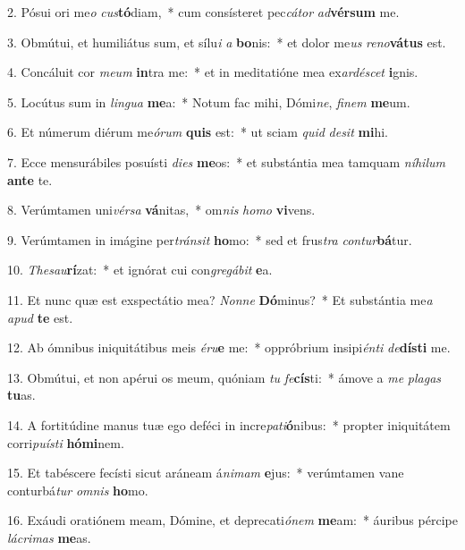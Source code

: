2. Pósui ori me\textit{o} \textit{cus}\textbf{tó}diam,~*  cum consísteret pec\textit{cá}\textit{tor} \textit{ad}\textbf{vér}\textbf{sum} me.\

3. Obmútui, et humiliátus sum, et sílu\textit{i} \textit{a} \textbf{bo}nis:~*  et dolor me\textit{us} \textit{re}\textit{no}\textbf{vá}\textbf{tus} est.\

4. Concáluit cor \textit{me}\textit{um} \textbf{in}tra me:~*  et in meditatióne mea ex\textit{ar}\textit{dé}\textit{scet} \textbf{i}gnis.\

5. Locútus sum in \textit{lin}\textit{gua} \textbf{me}a:~*  Notum fac mihi, Dómi\textit{ne}, \textit{fi}\textit{nem} \textbf{me}um.\

6. Et númerum diérum me\textit{ó}\textit{rum} \textbf{quis} est:~*  ut sciam \textit{quid} \textit{de}\textit{sit} \textbf{mi}hi.\

7. Ecce mensurábiles posuísti \textit{di}\textit{es} \textbf{me}os:~*  et substántia mea tamquam \textit{ní}\textit{hi}\textit{lum} \textbf{an}\textbf{te} te.\

8. Verúmtamen uni\textit{vér}\textit{sa} \textbf{vá}nitas,~*  om\textit{nis} \textit{ho}\textit{mo} \textbf{vi}vens.\

9. Verúmtamen in imágine per\textit{tráns}\textit{it} \textbf{ho}mo:~*  sed et frus\textit{tra} \textit{con}\textit{tur}\textbf{bá}tur.\

10. \textit{The}\textit{sau}\textbf{rí}zat:~*  et ignórat cui con\textit{gre}\textit{gá}\textit{bit} \textbf{e}a.\

11. Et nunc quæ est exspectátio mea? \textit{Non}\textit{ne} \textbf{Dó}minus?~*  Et substántia me\textit{a} \textit{a}\textit{pud} \textbf{te} est.\

12. Ab ómnibus iniquitátibus meis \textit{é}\textit{ru}\textbf{e} me:~*  oppróbrium insipi\textit{én}\textit{ti} \textit{de}\textbf{dís}\textbf{ti} me.\

13. Obmútui, et non apérui os meum, quóniam \textit{tu} \textit{fe}\textbf{cís}ti:~*  ámove a \textit{me} \textit{pla}\textit{gas} \textbf{tu}as.\

14. A fortitúdine manus tuæ ego deféci in incre\textit{pa}\textit{ti}\textbf{ó}nibus:~*  propter iniquitátem corri\textit{pu}\textit{ís}\textit{ti} \textbf{hó}\textbf{mi}nem.\

15. Et tabéscere fecísti sicut aráneam á\textit{ni}\textit{mam} \textbf{e}jus:~*  verúmtamen vane conturbá\textit{tur} \textit{om}\textit{nis} \textbf{ho}mo.\

16. Exáudi oratiónem meam, Dómine, et deprecati\textit{ó}\textit{nem} \textbf{me}am:~*  áuribus pércipe \textit{lá}\textit{cri}\textit{mas} \textbf{me}as.\

